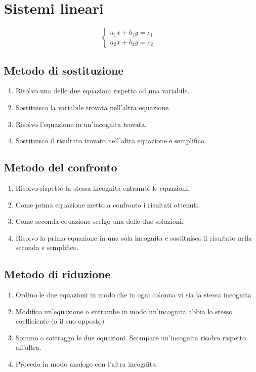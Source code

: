 \chapter{Sistemi lineari}
\[\begin{cases}
a_{1}x+b_{1}y=c_{1}\\
a_2x+b_2y=c_2
\end{cases}\]
\section{Metodo di sostituzione}
\begin{enumerate}
	\item Risolvo una delle due equazioni rispetto ad una variabile.
	\item Sostituisco la variabile trovata nell'altra equazione.
	\item Risolvo l'equazione in un'incognita trovata.
	\item Sostituisco il risultato trovato nell'altra equazione e semplifico.
\end{enumerate}
\section{Metodo del confronto}
\begin{enumerate}
	\item Risolvo rispetto la stessa incognita entrambi le equazioni.
	\item Come prima equazione metto a confronto i risultati ottenuti.
	\item Come seconda equazione scelgo una delle due soluzioni.
	\item Risolvo la prima equazione in una sola incognita e sostituisco il risultato nella seconda e semplifico.
\end{enumerate}
\section{Metodo di riduzione}
\begin{enumerate}
	\item Ordino le due equazioni in modo che in ogni colonna vi sia la stessa incognita
	\item Modifico un'equazione o entrambe in modo un'incognita abbia lo stesso coefficiente (o il suo opposto)
	\item Sommo o sottraggo le due equazioni. Scompare un'incognita risolvo rispetto all'altra.
	\item Procedo in modo analogo con l'altra incognita.
\end{enumerate}
